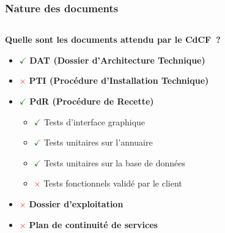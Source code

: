 \begin{frame}
\frametitle{Nature des documents}
\begin{columns}[c]
\begin{column}{12cm}
\begin{block}{\textbf{Quelle sont les documents attendu par le CdCF~?}}
\begin{itemize}
\item \textcolor{green}{$\checkmark$} \textbf{DAT (Dossier d'Architecture Technique)}
\item \textcolor{red}{$\times$} \textbf{PTI (Procédure d'Installation Technique)}
\item \textcolor{green}{$\checkmark$} \textbf{PdR (Procédure de Recette)}
\begin{itemize}
\item \textcolor{green}{$\checkmark$} Tests d'interface graphique
\item \textcolor{green}{$\checkmark$} Tests unitaires sur l'annuaire
\item \textcolor{green}{$\checkmark$} Tests unitaires sur la base de données
\item \textcolor{red}{$\times$} Tests fonctionnels validé par le client
\end{itemize}
\item \textcolor{red}{$\times$} \textbf{Dossier d'exploitation}
\item \textcolor{red}{$\times$} \textbf{Plan de continuité de services}
\end{itemize}
\end{block}
\end{column}
\end{columns}
\end{frame}


